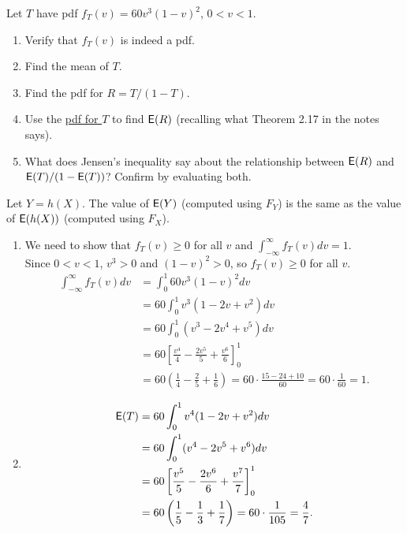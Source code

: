 \documentclass[12pt]{article}
\newcommand{\E}{{\sf E}}
\newenvironment{theorem}[2][Theorem]{\begin{trivlist}
\item[\hskip \labelsep {\bfseries #1}\hskip \labelsep {\bfseries #2.}]}
{\end{trivlist}}
\newenvironment{problem}[2][Problem]{\begin{trivlist}
\item[\hskip \labelsep {\bfseries #1}\hskip \labelsep {\bfseries #2.}]}
{\end{trivlist}}
\begin{document}
\begin{problem}{5} Let $T$ have pdf $f_T(v) = 60v^3(1-v)^2$, $0 < v < 1$.
  \begin{enumerate}
    \item Verify that $f_T(v)$ is indeed a pdf.
    \item Find the mean of $T$.
    \item Find the pdf for $R=T/(1-T)$.
    \item Use the \underline{pdf for $T$} to find $\E(R)$ 
    (recalling what Theorem 2.17 in the notes says).
    \item What does Jensen's inequality say about the relationship between
    $\E(R)$ and $\E(T)/(1-\E(T))$? Confirm by evaluating both.
  \end{enumerate}
  \begin{theorem}{2.17}
    Let $Y = h(X)$. The value of $\E(Y)$ (computed using $F_Y$) 
    is the same as the value of $\E(h(X))$ (computed using $F_X$).
  \end{theorem}
  \begin{enumerate}
    \item We need to show that
    $f_T(v) \ge 0$ for all $v$ and $\int_{-\infty}^{\infty} f_T(v) dv = 1$.\\
    Since $0 < v < 1$, $v^3 > 0$ and $(1-v)^2 > 0$, 
    so $f_T(v) \ge 0$ for all $v$.
    \[
      \begin{aligned}
        \int_{-\infty}^{\infty} f_T(v) dv &= \int_{0}^{1} 60v^3(1-v)^2 dv \\
        &= 60 \int_{0}^{1} v^3 (1 - 2v + v^2) dv \\
        &= 60 \int_{0}^{1} (v^3 - 2v^4 + v^5) dv \\
        &= 60 \left[ \frac{v^4}{4} - \frac{2v^5}{5} + \frac{v^6}{6} 
        \right]_{0}^{1} \\
        &= 60 \left( \frac14 - \frac25 + \frac16 \right) 
        = 60 \cdot \frac{15-24+10}{60} = 60 \cdot \frac{1}{60} = 1.
      \end{aligned}
    \]
    \item
    \[
      \begin{aligned}
        \E(T) &= 60 \int_{0}^{1} v^4 (1 - 2v + v^2) dv \\
        &= 60 \int_{0}^{1} (v^4 - 2v^5 + v^6) dv \\
        &= 60 \left[ \frac{v^5}{5} - \frac{2v^6}{6} + \frac{v^7}{7} 
        \right]_{0}^{1} \\
        &= 60 \left( \frac15 - \frac13 + \frac17 \right) 
        = 60 \cdot \frac{1}{105} = \frac{4}{7}.

\end{aligned}\]
\end{enumerate}
\end{problem}
\end{document}
